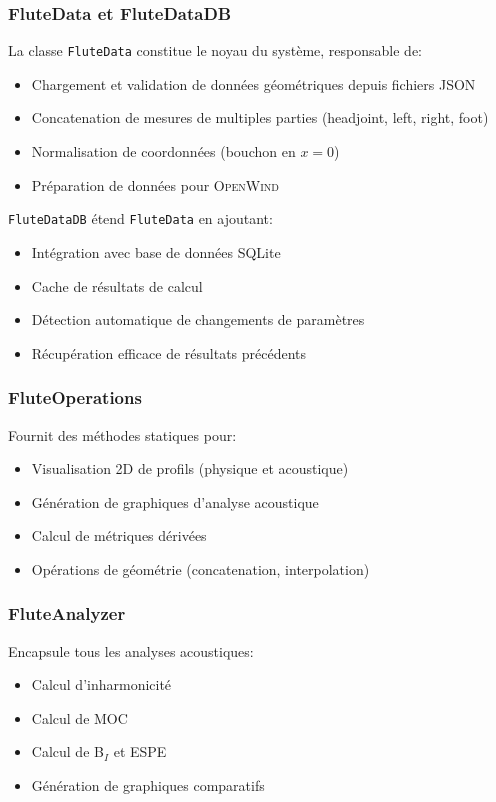 \documentclass[12pt,a4paper,twocolumn]{article}
\newcommand{\openwind}{\textsc{OpenWind}}
\begin{document}
\subsubsection{FluteData et FluteDataDB}

La classe \texttt{FluteData} constitue le noyau du système, responsable de:
\begin{itemize}
    \item Chargement et validation de données géométriques depuis fichiers JSON
    \item Concatenation de mesures de multiples parties (headjoint, left, right, foot)
    \item Normalisation de coordonnées (bouchon en $x=0$)
    \item Préparation de données pour \openwind{}
\end{itemize}

\texttt{FluteDataDB} étend \texttt{FluteData} en ajoutant:
\begin{itemize}
    \item Intégration avec base de données SQLite
    \item Cache de résultats de calcul
    \item Détection automatique de changements de paramètres
    \item Récupération efficace de résultats précédents
\end{itemize}

\subsubsection{FluteOperations}

Fournit des méthodes statiques pour:
\begin{itemize}
    \item Visualisation 2D de profils (physique et acoustique)
    \item Génération de graphiques d'analyse acoustique
    \item Calcul de métriques dérivées
    \item Opérations de géométrie (concatenation, interpolation)
\end{itemize}

\subsubsection{FluteAnalyzer}

Encapsule tous les analyses acoustiques:
\begin{itemize}
    \item Calcul d'inharmonicité
    \item Calcul de MOC
    \item Calcul de B$_I$ et ESPE
    \item Génération de graphiques comparatifs
\end{itemize}
\end{document}
